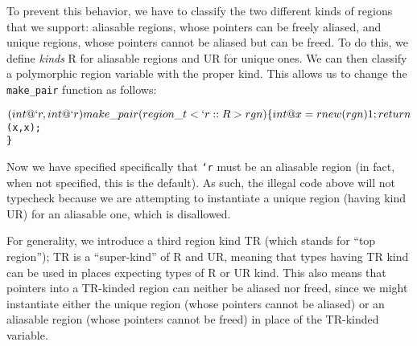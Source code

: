 To prevent this behavior, we have to classify the two different kinds of
regions that we support: aliasable regions, whose pointers can be freely
aliased, and unique regions, whose pointers cannot be aliased but can be
freed.  To do this, we define \emph{kinds} R for aliasable regions and UR for
unique ones.  We can then classify a polymorphic region variable with the
proper kind.  This allows us to change the \texttt{make\_pair} function as
follows:
\begin{alltt}
  $(int @`r, int @`r) make\_pair(region\_t<`r::R> rgn) \{
    int @x = rnew (rgn) 1;
    return $(x, x);
  \}
\end{alltt}
Now we have specified specifically that \texttt{`r} must be an aliasable
region (in fact, when not specified, this is the default).  As such, the
illegal code above will not typecheck because we are attempting to
instantiate a unique region (having kind UR) for an aliasable one, which is
disallowed.

For generality, we introduce a third region kind TR (which stands for ``top
region''); TR is a ``super-kind'' of R and UR, meaning that types having TR
kind can be used in places expecting types of R or UR kind.  This also means
that pointers into a TR-kinded region can neither be aliased nor freed,
since we might instantiate either the unique region (whose pointers cannot
be aliased) or an aliasable region (whose pointers cannot be freed) in place
of the TR-kinded variable.

